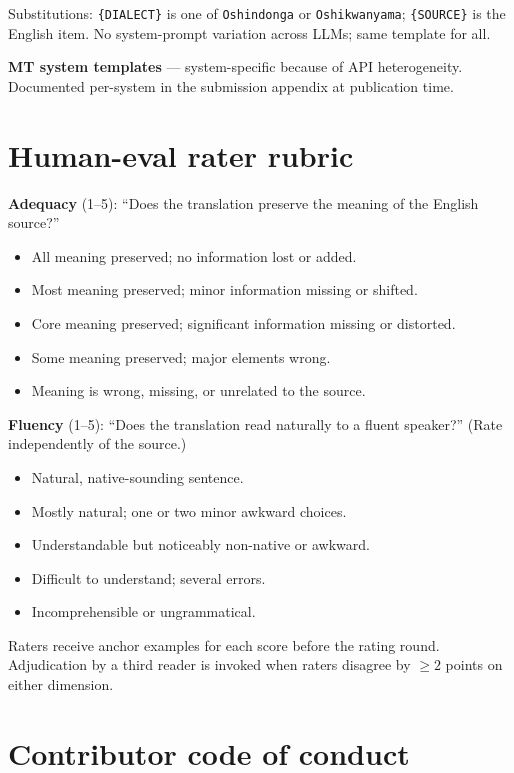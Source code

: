 \documentclass[11pt]{article}
\begin{document}
Substitutions: \texttt{\{DIALECT\}} is one of \texttt{Oshindonga} or
\texttt{Oshikwanyama}; \texttt{\{SOURCE\}} is the English item. No
system-prompt variation across LLMs; same template for all.

\textbf{MT system templates} --- system-specific because of API
heterogeneity. Documented per-system in the submission appendix at
publication time.

\section{Human-eval rater rubric}
\label{appendix:rubric}

\textbf{Adequacy} (1--5): ``Does the translation preserve the
meaning of the English source?''

\begin{itemize}\itemsep0pt
\item[5] All meaning preserved; no information lost or added.
\item[4] Most meaning preserved; minor information missing or shifted.
\item[3] Core meaning preserved; significant information missing or distorted.
\item[2] Some meaning preserved; major elements wrong.
\item[1] Meaning is wrong, missing, or unrelated to the source.
\end{itemize}

\textbf{Fluency} (1--5): ``Does the translation read naturally to a
fluent speaker?'' (Rate independently of the source.)

\begin{itemize}\itemsep0pt
\item[5] Natural, native-sounding sentence.
\item[4] Mostly natural; one or two minor awkward choices.
\item[3] Understandable but noticeably non-native or awkward.
\item[2] Difficult to understand; several errors.
\item[1] Incomprehensible or ungrammatical.
\end{itemize}

Raters receive anchor examples for each score before the rating
round. Adjudication by a third reader is invoked when raters
disagree by $\geq 2$ points on either dimension.

\section{Contributor code of conduct}
\label{appendix:coc}
\end{document}
